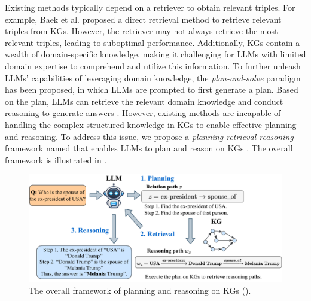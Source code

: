 {Existing methods typically depend on a retriever to obtain relevant triples. For example, Baek et al. \cite{baek2023direct} proposed a direct retrieval method to retrieve relevant triples from KGs. However, the retriever may not always retrieve the most relevant triples, leading to suboptimal performance. Additionally, KGs contain a wealth of domain-specific knowledge, making it challenging for LLMs with limited domain expertise to comprehend and utilize this information. To further unleash LLMs' capabilities of leveraging domain knowledge, the \textit{plan-and-solve} paradigm \cite{wang2023plan} has been proposed, in which LLMs are prompted to first generate a plan. Based on the plan, LLMs can retrieve the relevant domain knowledge and conduct reasoning to generate answers \cite{yaoreact}. However, existing methods are incapable of handling the complex structured knowledge in KGs to enable effective planning and reasoning. To address this issue, we propose a \textit{planning-retrieval-reasoning} framework named \ourmethod that enables LLMs to plan and reason on KGs \cite{luo2024reasoning}. The overall framework is illustrated in .

\begin{figure}[htbp]
    \begin{center}
    \includegraphics[width=.85\columnwidth]{submissions/CarlYang2024/figures/rog.pdf}
    \end{center}
    \caption{The overall framework of planning and reasoning on KGs (\ourmethod).}
    \label{fig:rog}
\end{figure}

}
